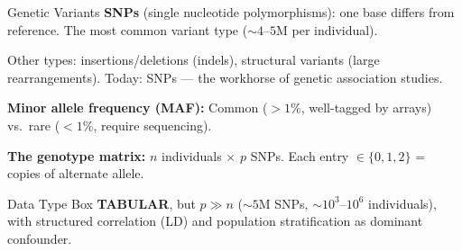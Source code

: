\documentclass[aspectratio=169,10pt]{beamer}
\begin{document}
\begin{frame}{Genetic Variants}
\textbf{SNPs} (single nucleotide polymorphisms): one base differs from reference. The most common variant type (${\sim}4$--$5$M per individual).

\vspace{0.2em}
Other types: insertions/deletions (indels), structural variants (large rearrangements). Today: SNPs --- the workhorse of genetic association studies.

\vspace{0.2em}
\textbf{Minor allele frequency (MAF):} Common ($>1\%$, well-tagged by arrays) vs.\ rare ($<1\%$, require sequencing).

\vspace{0.3em}
\textbf{The genotype matrix:} $n$ individuals $\times$ $p$ SNPs. Each entry $\in \{0,1,2\}$ = copies of alternate allele.

\vspace{0.2em}
\begin{block}{Data Type Box}
\textbf{TABULAR}, but $p \gg n$ (${\sim}5$M SNPs, ${\sim}10^3$--$10^6$ individuals), with structured correlation (LD) and population stratification as dominant confounder.
\end{block}
\end{frame}
\end{document}
